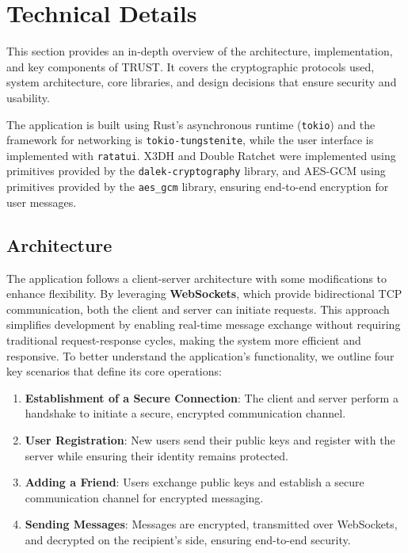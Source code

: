 \chapter{Technical Details}
\label{cha:TechnicalDetails}

This section provides an in-depth overview of the architecture, implementation, and key components of TRUST. It covers the cryptographic protocols used, system architecture, core libraries, and design decisions that ensure security and usability.

The application is built using Rust’s asynchronous runtime (\texttt{tokio}) and the  framework for networking is \texttt{tokio-tungstenite}, while the user interface is implemented with \texttt{ratatui}. X3DH and Double Ratchet were implemented using primitives provided by the \texttt{dalek-cryptography} library, and AES-GCM using primitives provided by the \texttt{aes\_gcm} library, ensuring end-to-end encryption for user messages.


\section{Architecture}
\label{sec:Architecture}

The application follows a client-server architecture with some modifications to enhance flexibility. By leveraging \textbf{WebSockets}, which provide bidirectional TCP communication, both the client and server can initiate requests. This approach simplifies development by enabling real-time message exchange without requiring traditional request-response cycles, making the system more efficient and responsive.
To better understand the application's functionality, we outline four key scenarios that define its core operations:

\begin{enumerate}
    \item \textbf{Establishment of a Secure Connection}: The client and server perform a handshake to initiate a secure, encrypted communication channel.
    \item \textbf{User Registration}: New users send their public keys and register with the server while ensuring their identity remains protected.
    \item \textbf{Adding a Friend}: Users exchange public keys and establish a secure communication channel for encrypted messaging.
    \item \textbf{Sending Messages}: Messages are encrypted, transmitted over WebSockets, and decrypted on the recipient’s side, ensuring end-to-end security.
\end{enumerate}

